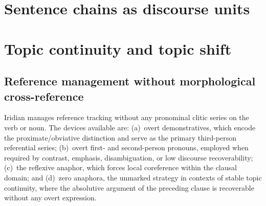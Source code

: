 %
%

\section{Sentence chains as discourse units}\label{sec:discourse-chains}


\section{Topic continuity and topic shift}\label{sec:topic-continuity}


\subsection{Reference management without morphological cross-reference}
\label{sec:ref-management}

Iridian manages reference tracking without any pronominal clitic series on the
verb or noun. The devices available are: (a)~overt demonstratives, which encode
the proximate/obviative distinction and serve as the primary third-person
referential series; (b)~overt first- and second-person pronouns, employed when
required by contrast, emphasis, disambiguation, or low discourse recoverability;
(c)~the reflexive anaphor, which forces local coreference within the clausal
domain; and (d)~zero anaphora, the unmarked strategy in contexts of stable topic
continuity, where the absolutive argument of the preceding clause is recoverable
without any overt expression.


